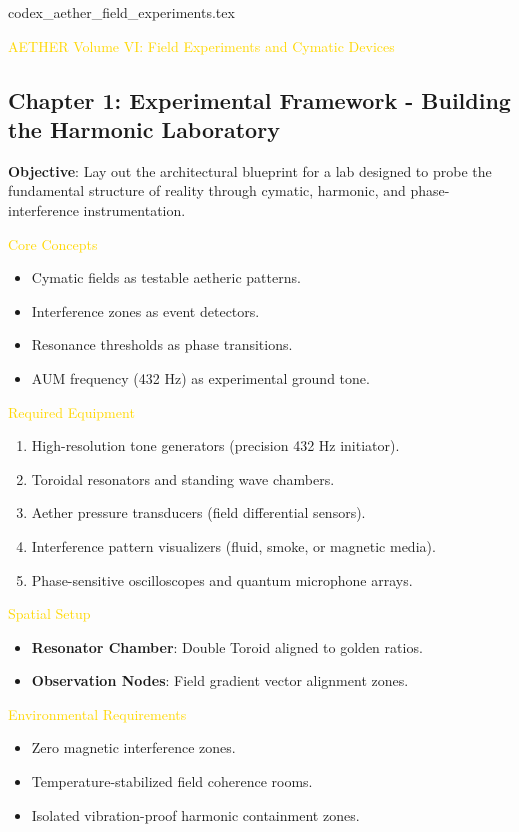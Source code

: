 codex_aether_field_experiments.tex 

\textcolor{gold}{ AETHER Volume VI: Field Experiments and Cymatic Devices }

\subsection{Chapter 1: Experimental Framework - Building the Harmonic Laboratory}

\textbf{Objective}: Lay out the architectural blueprint for a lab designed to probe the fundamental structure of reality through cymatic, harmonic, and phase-interference instrumentation.

\textcolor{gold}{ Core Concepts }
\begin{itemize}
    \item Cymatic fields as testable aetheric patterns.
    \item Interference zones as event detectors.
    \item Resonance thresholds as phase transitions.
    \item AUM frequency (432 Hz) as experimental ground tone.
\end{itemize}

\textcolor{gold}{ Required Equipment }
\begin{enumerate}
    \item High-resolution tone generators (precision 432 Hz initiator).
    \item Toroidal resonators and standing wave chambers.
    \item Aether pressure transducers (field differential sensors).
    \item Interference pattern visualizers (fluid, smoke, or magnetic media).
    \item Phase-sensitive oscilloscopes and quantum microphone arrays.
\end{enumerate}

\textcolor{gold}{ Spatial Setup }
\begin{itemize}
    \item \textbf{Resonator Chamber}: Double Toroid aligned to golden ratios.
    \item \textbf{Observation Nodes}: Field gradient vector alignment zones.
\end{itemize}

\textcolor{gold}{ Environmental Requirements }
\begin{itemize}
    \item Zero magnetic interference zones.
    \item Temperature-stabilized field coherence rooms.
    \item Isolated vibration-proof harmonic containment zones.
\end{itemize}

